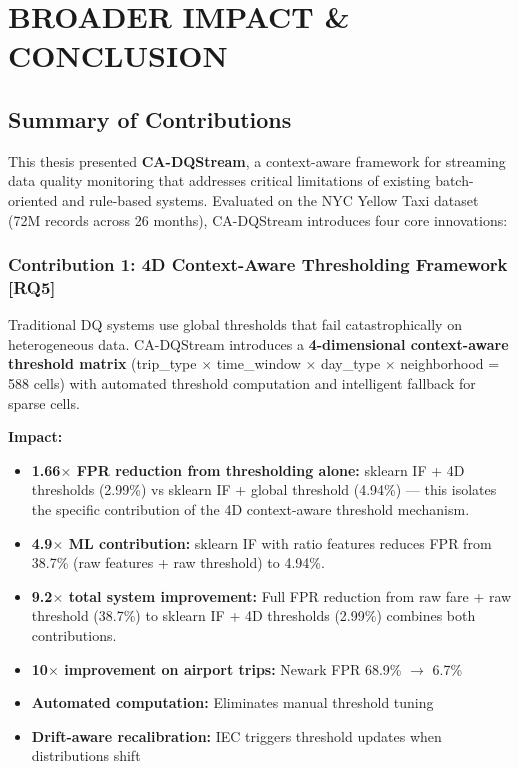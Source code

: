 \newpage
\chapter{BROADER IMPACT \& CONCLUSION}
\pagestyle{fancy}

\section{Summary of Contributions}

This thesis presented \textbf{CA-DQStream}, a context-aware framework for streaming data quality monitoring that addresses critical limitations of existing batch-oriented and rule-based systems. Evaluated on the NYC Yellow Taxi dataset (72M records across 26 months), CA-DQStream introduces four core innovations:

\subsection{Contribution 1: 4D Context-Aware Thresholding Framework [RQ5]}

Traditional DQ systems use global thresholds that fail catastrophically on heterogeneous data. CA-DQStream introduces a \textbf{4-dimensional context-aware threshold matrix} (trip\_type $\times$ time\_window $\times$ day\_type $\times$ neighborhood = 588 cells) with automated threshold computation and intelligent fallback for sparse cells.

\textbf{Impact:}
\begin{itemize}
    \item \textbf{1.66$\times$ FPR reduction from thresholding alone:} sklearn IF + 4D thresholds (2.99\%) vs sklearn IF + global threshold (4.94\%) --- this isolates the specific contribution of the 4D context-aware threshold mechanism.
    \item \textbf{4.9$\times$ ML contribution:} sklearn IF with ratio features reduces FPR from 38.7\% (raw features + raw threshold) to 4.94\%.
    \item \textbf{9.2$\times$ total system improvement:} Full FPR reduction from raw fare + raw threshold (38.7\%) to sklearn IF + 4D thresholds (2.99\%) combines both contributions.
    \item \textbf{10$\times$ improvement on airport trips:} Newark FPR 68.9\% $\to$ 6.7\%
    \item \textbf{Automated computation:} Eliminates manual threshold tuning
    \item \textbf{Drift-aware recalibration:} IEC triggers threshold updates when distributions shift
\end{itemize}

